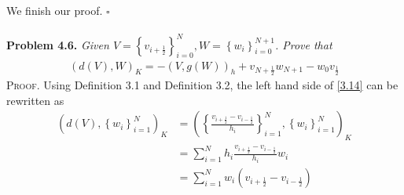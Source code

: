 \documentclass[a4paper]{article}
\numberwithin{equation}{section}
\begin{document}
We finish our proof. \hfill $\square$\\
\\
\textbf{Problem 4.6.} \textit{Given $V=\left\{ {{v_{i + \frac{1}{2}}}} \right\}_{i = 0}^N,W=\left\{ {{w_i}} \right\}_{i = 0}^{N + 1}$. Prove that}
\begin{align}
{\left( {d\left( V \right),W} \right)_K} =  - {\left( {V,g\left( W \right)} \right)_h} + {v_{N + \frac{1}{2}}}{w_{N + 1}} - {w_0}{v_{\frac{1}{2}}}
\end{align}
\textsc{Proof.} Using Definition 3.1 and Definition 3.2, the left hand side of \eqref{3.14} can be rewritten as
\begin{align}
{\left( {d\left( V \right),\left\{ {{w_i}} \right\}_{i = 1}^N} \right)_K} &= {\left( {\left\{ {\frac{{{v_{i + \frac{1}{2}}} - {v_{i - \frac{1}{2}}}}}{{{h_i}}}} \right\}_{i = 1}^N,\left\{ {{w_i}} \right\}_{i = 1}^N} \right)_K}\\
& = \sum\limits_{i = 1}^N {{h_i}\frac{{{v_{i + \frac{1}{2}}} - {v_{i - \frac{1}{2}}}}}{{{h_i}}}{w_i}} \\
& = \sum\limits_{i = 1}^N {{w_i}\left( {{v_{i + \frac{1}{2}}} - {v_{i - \frac{1}{2}}}} \right)} \label{4.112}
\end{align}
\end{document}
